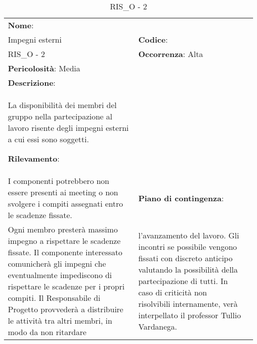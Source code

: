 \renewcommand{\arraystretch}{1.5}
\begin{longtable} { 
		>{\raggedright}p{} 
		>{\raggedright}p{} 
		>{\raggedright}p{}    }
	
	\caption{RIS\_O - 2 } \endhead	
	
	
	\textbf{Nome}: \\ Impegni esterni 
	& \textbf{Codice}: \\ RIS\_O - 2
	& \textbf{Occorrenza}: Alta \\ \textbf{Pericolosità}: Media
	
	\tabularnewline
	
	\textbf{Descrizione}: \\ La disponibilità dei membri del gruppo nella partecipazione al lavoro risente degli impegni esterni a cui essi sono soggetti.
	
	\textbf{Rilevamento}: \\ I componenti potrebbero non essere presenti ai meeting o non svolgere i compiti assegnati entro le scadenze fissate.
	
	& 
	\textbf{Piano di contingenza}: \\ Ogni membro presterà massimo impegno a rispettare le scadenze fissate. Il componente interessato comunicherà gli impegni che eventualmente impediscono di rispettare le scadenze per i propri compiti. Il Responsabile di Progetto provvederà a distribuire le attività tra altri membri, in modo da non ritardare	
	& 
	l'avanzamento del lavoro. Gli incontri se possibile vengono fissati con discreto anticipo valutando la possibilità della partecipazione di tutti. 
	In caso di criticità non risolvibili internamente, verà interpellato il professor Tullio Vardanega.
	
	
\end{longtable}


